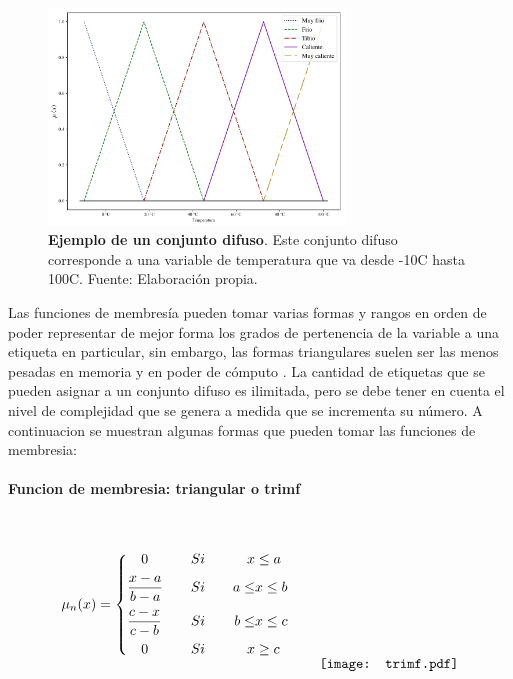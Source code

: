             \begin{figure}[htb]
                \centering
                \includegraphics[width=0.7\textwidth]{FuzzySet.pdf}
                \caption[Ejemplo de un conjunto difuso]{\textbf{Ejemplo de un conjunto difuso}. Este conjunto difuso corresponde a una variable de temperatura que va desde -10\textdegree C hasta 100\textdegree C. Fuente: Elaboración propia.} 
                \label{fig:FuzzySet}
            \end{figure}
            
            Las funciones de membresía pueden tomar varias formas y rangos en orden de poder representar de mejor forma los grados de pertenencia de la variable a una etiqueta en particular, sin embargo, las formas triangulares suelen ser las menos pesadas en memoria y en poder de cómputo \Parencite{riid2003transparent}. La cantidad de etiquetas que se pueden asignar a un conjunto difuso es ilimitada, pero se debe tener en cuenta el nivel de complejidad que se genera a medida que se incrementa su número. A continuacion se muestran algunas formas que pueden tomar las funciones de membresia:

            \paragraph{Funcion de membresia: triangular o trimf}$\quad$
            
            \begin{equation*}\label{eq:trimf}
                \mu_n(x) = \left\{
                    \begin{aligned}
                        &\quad 0  &\quad &Si \quad & x &\leq a\\
                        &\frac{x - a}{b - a}  &\quad &Si \quad &  a \le &x \leq b \\
                        &\frac{c - x}{c - b}  &\quad &Si \quad & b \le &x \leq c \\
                        &\quad 0  &\quad &Si \quad&  x &\geq c
                    \end{aligned}\right.
                    \qquad
                    \raisebox{-15mm}{\texttt{[image: trimf.pdf]}}
            \end{equation*}
            
